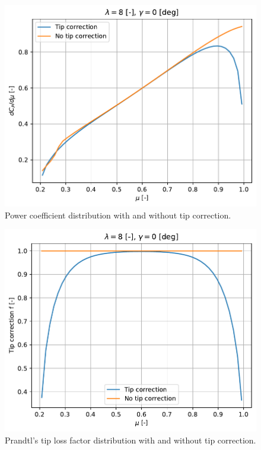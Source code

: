 \begin{figure}[htbp]
	\centering
	\includegraphics[height=0.45\textheight]{./img/tip-correction/dcp_dmu.pdf}
	\caption{Power coefficient distribution with and without tip correction.}
	\label{img:tc-dcp-dmu}
\end{figure}

\begin{figure}[htbp]
	\centering
	\includegraphics[height=0.45\textheight]{./img/tip-correction/f.pdf}
	\caption{Prandtl's tip loss factor distribution with and without tip correction.}
	\label{img:tc-f}
\end{figure}

